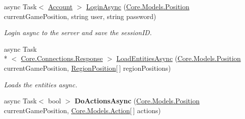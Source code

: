 \begin{DoxyCompactItemize}
async Task$<$ \hyperlink{classCore_1_1Models_1_1Account}{Account} $>$ \hyperlink{classClient_1_1Common_1_1Controllers_1_1NetworkController_af3c0e3f5073dda246d20513013286919}{Login\-Async} (\hyperlink{classCore_1_1Models_1_1Position}{Core.\-Models.\-Position} current\-Game\-Position, string user, string password)
\begin{DoxyCompactList}\small\item\em Login async to the server and save the session\-I\-D. \end{DoxyCompactList}\item 
async Task\\*
$<$ \hyperlink{classCore_1_1Connections_1_1Response}{Core.\-Connections.\-Response} $>$ \hyperlink{classClient_1_1Common_1_1Controllers_1_1NetworkController_a27e260e1481b6ec9186915a9f64c3dce}{Load\-Entities\-Async} (\hyperlink{classCore_1_1Models_1_1Position}{Core.\-Models.\-Position} current\-Game\-Position, \hyperlink{classCore_1_1Models_1_1RegionPosition}{Region\-Position}\mbox{[}$\,$\mbox{]} region\-Positions)
\begin{DoxyCompactList}\small\item\em Loads the entities async. \end{DoxyCompactList}\item 
\hypertarget{classClient_1_1Common_1_1Controllers_1_1NetworkController_a475c46ddb8c5dc4db7dea1530af9bf4b}{async Task$<$ bool $>$ {\bfseries Do\-Actions\-Async} (\hyperlink{classCore_1_1Models_1_1Position}{Core.\-Models.\-Position} current\-Game\-Position, \hyperlink{classCore_1_1Models_1_1Action}{Core.\-Models.\-Action}\mbox{[}$\,$\mbox{]} actions)}\label{classClient_1_1Common_1_1Controllers_1_1NetworkController_a475c46ddb8c5dc4db7dea1530af9bf4b}

\end{DoxyCompactItemize}
